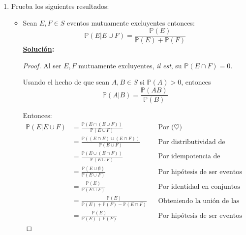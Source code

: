 \documentclass[11pt,letterpaper]{report}
\newcommand{\Pro}{\mathds{P}}
\newcommand{\sol}{\textbf{\underline{Solución}: }} %
\begin{document}
\begin{enumerate}

\item Prueba los siguientes resultados:
\begin{itemize}
    \item Sean $E, F \in S$ eventos mutuamente excluyentes entonces:
    \[
        \Pro(E|E \cup F) = \frac{\Pro(E)}{\Pro(E) + \Pro(F)}
    \]
    \sol \begin{proof}
        Al ser $E,F$ mutuamente excluyentes, \textit{il est}, su $\Pro(E \cap F) = 0$.

        Usando el hecho de que sean $A, B \in S$ si $\Pro(A) > 0$, entonces
        \[
            \Pro(A | B) = \frac{\Pro(AB)}{\Pro(B)} \tag{$\heartsuit$}
        \]

        Entonces:
        \begin{align*}
            \Pro(E | E \cup F)
                &= \frac{\Pro(E \cap (E \cup F))}{\Pro(E \cup F)} && \text{Por ($\heartsuit$)}\\
                &= \frac{\Pro((E \cap E) \cup (E \cap F))}{\Pro(E \cup F)} && \text{Por distributividad de conjuntos}\\
                &= \frac{\Pro(E \cup (E \cap F))}{\Pro(E \cup F)} && \text{Por idempotencia de conjuntos}\\
                &= \frac{\Pro(E \cup \emptyset)}{\Pro(E \cup F)} && \text{Por hipótesis de ser eventos mutuamente excluyentes}\\
                &= \frac{\Pro(E)}{\Pro(E \cup F)} && \text{Por identidad en conjuntos}\\
                &= \frac{\Pro(E)}{\Pro(E) + \Pro(F) - \Pro(E \cap F)} && \text{Obteniendo la unión de las probabilidades}\\
                &= \frac{\Pro(E)}{\Pro(E) + \Pro(F)} && \text{Por hipótesis de ser eventos mutuamente excluyentes}
        \end{align*}
    \end{proof}
    

\end{itemize}
\end{enumerate}
\end{document}
